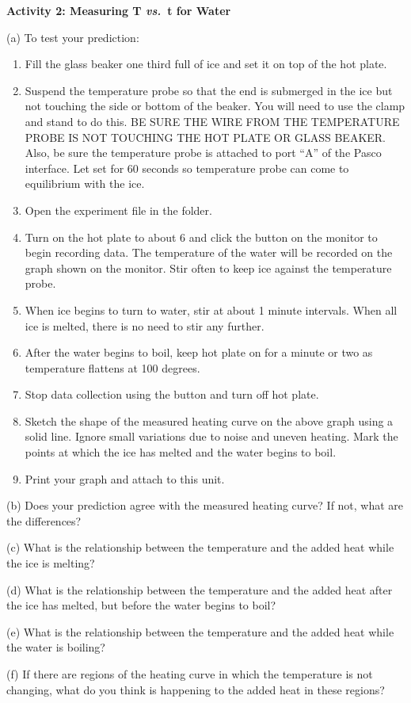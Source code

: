 \pagebreak[3]

\textbf{Activity 2: Measuring T \textit{vs.}~t for Water} 

(a) To test your prediction: 

\begin{enumerate}
\item Fill the glass beaker one third full of ice and set it on top of the hot plate.
\item Suspend the temperature probe so that the end is submerged in the ice but not touching the side or bottom of the beaker. You will need to use the clamp and stand to do this. BE SURE THE WIRE FROM THE TEMPERATURE PROBE IS NOT TOUCHING THE HOT PLATE OR GLASS BEAKER. Also, be sure the temperature probe is attached to port ``A'' of the Pasco interface. Let set for 60 seconds so temperature probe can come to equilibrium with the ice.
\item Open the  experiment file in the
\filename{\coursefolder} folder.
\item Turn on the hot plate to about 6 and click the
 button on the monitor to begin recording data. The temperature of the water will be recorded on the graph shown on the monitor. Stir often to keep ice against the temperature probe.
\item When ice begins to turn to water, stir at about 1 minute intervals. When all ice is melted, there is no need to stir any further.
\item After the water begins to boil, keep hot plate on for a minute or two as temperature flattens at 100 degrees.
\item Stop data collection using the  button and turn off hot plate.
\item Sketch the shape of the measured heating curve on the above graph
using a solid line. Ignore small variations due to noise and uneven
heating. Mark the points at which the ice has melted and the water
begins to boil.
\item Print your graph and attach to this unit.
\end{enumerate}
(b) Does your prediction agree with the measured heating curve? If
not, what are the differences?
\vspace{15mm}

(c) What is the relationship between the temperature and the added
heat while the ice is melting?
\vspace{15mm}

(d) What is the relationship between the temperature and the added
heat after the ice has melted, but before the water begins to boil?
\vspace{15mm}

(e) What is the relationship between the temperature and the added
heat while the water is boiling?
\vspace{15mm}

(f) If there are regions of the heating curve in which the temperature
is not changing, what do you think is happening to the added heat
in these regions?\vspace{20mm}

